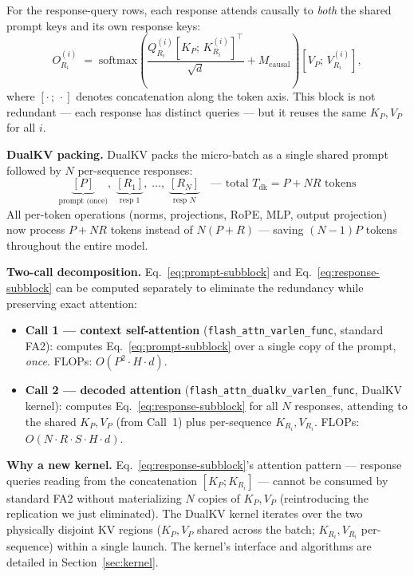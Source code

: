 \documentclass{article}
\begin{document}
For the response-query rows, each response attends causally to \emph{both} the shared prompt keys and its own response keys:
\begin{equation}
  O_{R_i}^{(i)} \;=\; \text{softmax}\!\left(\frac{Q_{R_i}^{(i)} [K_P;\, K_{R_i}^{(i)}]^\top}{\sqrt{d}} + M_{\text{causal}}\right) [V_P;\, V_{R_i}^{(i)}],
  \label{eq:response-subblock}
\end{equation}
where $[\cdot\,;\,\cdot]$ denotes concatenation along the token axis. This block is not redundant --- each response has distinct queries --- but it reuses the same $K_P, V_P$ for all $i$.

\textbf{DualKV packing.} DualKV packs the micro-batch as a single shared prompt followed by $N$ per-sequence responses:
\begin{equation}
  \underbrace{[P]}_{\text{prompt (once)}},\; \underbrace{[R_1]}_{\text{resp 1}},\; \ldots,\; \underbrace{[R_N]}_{\text{resp } N}
  \quad\text{--- total } T_{\text{dk}} = P + NR \text{ tokens}
  \label{eq:dualkv-packing}
\end{equation}
All per-token operations (norms, projections, RoPE, MLP, output projection) now process $P + NR$ tokens instead of $N(P+R)$ --- saving $(N{-}1)P$ tokens throughout the entire model.

\textbf{Two-call decomposition.} Eq.~\ref{eq:prompt-subblock} and Eq.~\ref{eq:response-subblock} can be computed separately to eliminate the redundancy while preserving exact attention:
\begin{itemize}
  \item \textbf{Call 1 --- context self-attention} (\texttt{flash\_attn\_varlen\_func}, standard FA2): computes Eq.~\ref{eq:prompt-subblock} over a single copy of the prompt, \emph{once}. FLOPs: $O(P^2 \cdot H \cdot d)$.
  \item \textbf{Call 2 --- decoded attention} (\texttt{flash\_attn\_dualkv\_varlen\_func}, DualKV kernel): computes Eq.~\ref{eq:response-subblock} for all $N$ responses, attending to the shared $K_P, V_P$ (from Call~1) plus per-sequence $K_{R_i}, V_{R_i}$. FLOPs: $O(N \cdot R \cdot S \cdot H \cdot d)$.
\end{itemize}

\textbf{Why a new kernel.} Eq.~\ref{eq:response-subblock}'s attention pattern --- response queries reading from the concatenation $[K_P; K_{R_i}]$ --- cannot be consumed by standard FA2 without materializing $N$ copies of $K_P, V_P$ (reintroducing the replication we just eliminated). The DualKV kernel iterates over the two physically disjoint KV regions ($K_P, V_P$ shared across the batch; $K_{R_i}, V_{R_i}$ per-sequence) within a single launch. The kernel's interface and algorithms are detailed in Section~\ref{sec:kernel}.
\end{document}
